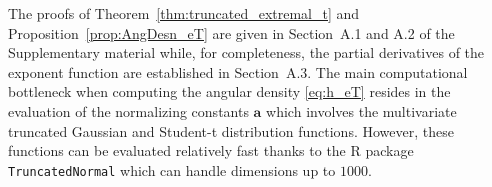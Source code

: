 \documentclass[lineno]{biometrika}
\begin{document}

The proofs of Theorem~\ref{thm:truncated_extremal_t}  and Proposition~\ref{prop:AngDesn_eT} are given in Section~A.1 and A.2 of the Supplementary material while, for completeness, the partial derivatives of the exponent function are established in Section~A.3.
The main computational bottleneck when computing the angular density \eqref{eq:h_eT} resides in the evaluation of the normalizing constants $\bm a$ which involves the multivariate truncated Gaussian and Student-t distribution functions. However, these functions can be evaluated relatively fast thanks to the R package \texttt{TruncatedNormal} \citep{Botev.Belzile:2021} which can handle dimensions up to $1000$.   
\end{document}
